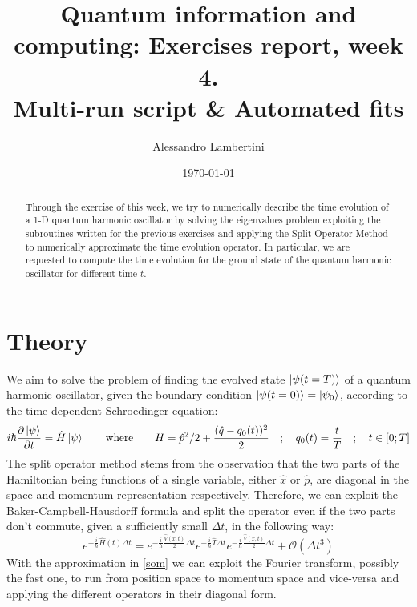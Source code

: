 \documentclass[prb,9pt,notitlepage]{revtex4-1}
\begin{document}
\title{Quantum information and computing: Exercises report, week 4. \\ Multi-run script \& Automated fits }

\author{Alessandro Lambertini}


\date{\today}

\begin{abstract}
Through the exercise of this week, we try to numerically describe the time evolution of a 1-D quantum harmonic oscillator by solving the eigenvalues problem exploiting the subroutines written for the previous exercises and applying the Split Operator Method to numerically approximate the time evolution operator. In particular, we are requested to compute the time evolution for the ground state of the quantum harmonic oscillator for different time $t$.
\end{abstract}

\maketitle

\section{Theory}
We aim to solve the problem of finding the evolved state $\ket{\psi(t=T)}$ of a quantum harmonic oscillator, given the boundary condition $\ket{\psi(t=0)}=\ket{\psi_0}$, according to the time-dependent Schroedinger equation:
\begin{equation}
  i\hbar \frac{\partial \ket{\psi}}{\partial t} = \hat{H}\ket{\psi} \qquad \mbox{where} \qquad H = \hat{p}^2/2 + \frac{(\hat{q}-q_0(t))^2}{2} \quad ; \quad q_0(t) = \frac{t}{T} \quad ; \quad t \in [0;T]
\end{equation}
The split operator method stems from the observation that the two parts of the Hamiltonian being functions of a single variable, either $\hat{x}$ or $\hat{p}$, are diagonal in the space and momentum representation respectively. Therefore, we can exploit the Baker-Campbell-Hausdorff formula and split the operator even if the two parts don't commute, given a sufficiently small $\Delta t$, in the following way:
\begin{equation}
  	e^{-\frac{i}{\hbar}\hat{H}(t) \Delta t} = e^{-\frac{i}{\hbar}\frac{\hat{V}(x,t)}{2} \Delta t} e^{-\frac{i}{\hbar} \hat{T} \Delta t}  e^{-\frac{i}{\hbar}\frac{\hat{V}(x,t)}{2} \Delta t} +\mathcal{O}(\Delta t^3) \label{som}
\end{equation}
With the approximation in \ref{som} we can exploit the Fourier transform, possibly the fast one, to run from position space to momentum space and vice-versa and applying the different operators in their diagonal form.
\end{document}
